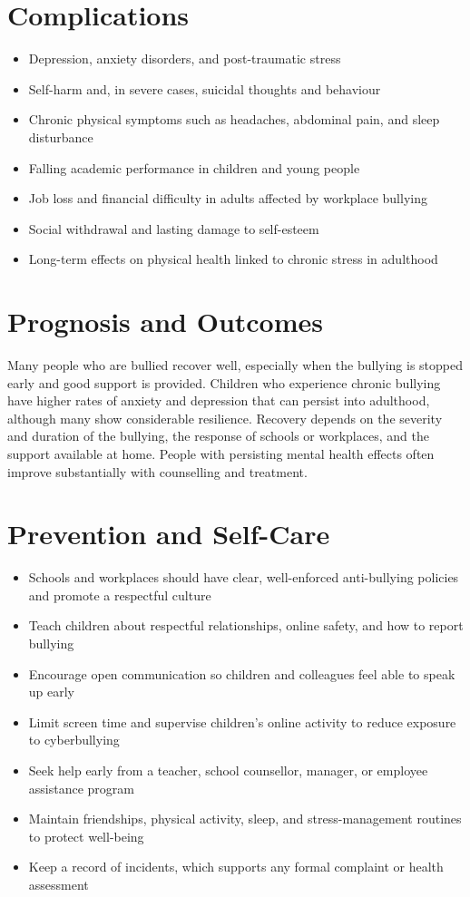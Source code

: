 \section*{Complications}
\begin{itemize}
    \item Depression, anxiety disorders, and post-traumatic stress
    \item Self-harm and, in severe cases, suicidal thoughts and behaviour
    \item Chronic physical symptoms such as headaches, abdominal pain, and sleep disturbance
    \item Falling academic performance in children and young people
    \item Job loss and financial difficulty in adults affected by workplace bullying
    \item Social withdrawal and lasting damage to self-esteem
    \item Long-term effects on physical health linked to chronic stress in adulthood
\end{itemize}

\section*{Prognosis and Outcomes}
Many people who are bullied recover well, especially when the bullying is stopped early and good support is provided. Children who experience chronic bullying have higher rates of anxiety and depression that can persist into adulthood, although many show considerable resilience. Recovery depends on the severity and duration of the bullying, the response of schools or workplaces, and the support available at home. People with persisting mental health effects often improve substantially with counselling and treatment.

\section*{Prevention and Self-Care}
\begin{itemize}
    \item Schools and workplaces should have clear, well-enforced anti-bullying policies and promote a respectful culture
    \item Teach children about respectful relationships, online safety, and how to report bullying
    \item Encourage open communication so children and colleagues feel able to speak up early
    \item Limit screen time and supervise children's online activity to reduce exposure to cyberbullying
    \item Seek help early from a teacher, school counsellor, manager, or employee assistance program
    \item Maintain friendships, physical activity, sleep, and stress-management routines to protect well-being
    \item Keep a record of incidents, which supports any formal complaint or health assessment
\end{itemize}


